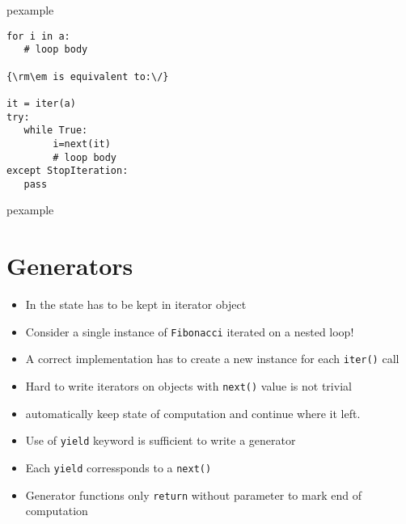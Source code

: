 \documentclass[trans,compress,xcolor=table]{beamer}
\begin{document}
\begin{frame}[fragile]
\begin{beamercolorbox}{pexample}
\begin{lstlisting}[escapeinside=\{\}]
for i in a:
   # loop body

{\rm\em is equivalent to:\/}

it = iter(a)
try:
   while True:
        i=next(it)
        # loop body
except StopIteration:
   pass
\end{lstlisting}\end{beamercolorbox}
\end{frame}

\begin{frame}
\begin{beamercolorbox}{pexample}
\codefibiter
\end{beamercolorbox}
\end{frame}

\section{Generators}
\begin{frame}
\begin{itemize}
\item In  the state has to be kept in iterator object
\item Consider  a single instance of \lstinline!Fibonacci! iterated on a nested loop!
\item A correct implementation has to create a new instance for each \lstinline!iter()! call
\item Hard to write iterators on objects with \lstinline!next()! value is
	not trivial
\item {} automatically keep state of computation and continue where it left.
\item Use of \lstinline!yield! keyword is sufficient to write a generator
\item Each \lstinline!yield! corressponds to a \lstinline!next()!
\item Generator functions only \lstinline!return! without parameter to
	mark end of computation
\end{itemize}
\end{frame}
\end{document}
